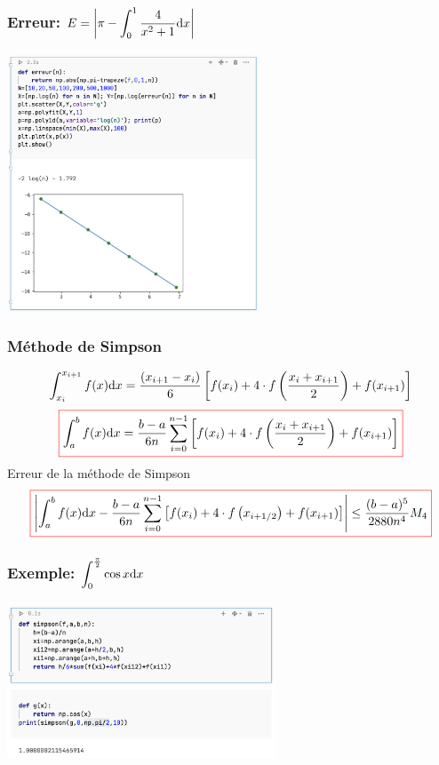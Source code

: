 \documentclass{beamer}
\def \de {{\rm d}}
\newcommand{\myredbox}[1]{\fcolorbox{red}{white}{$\displaystyle#1$}}
\begin{document}
\begin{frame}
 \frametitle{Erreur: $\displaystyle E=\left|\pi - \int_0^1\frac{4}{x^2+1}\de x \right|$}
\begin{center}
\includegraphics[width=7.5cm]{images/methodeDeTrapeze01.png}
\end{center}
 

\end{frame}
\begin{frame}
 \frametitle{Méthode de Simpson}
  \[\int_{x_i}^{x_{i+1}}f(x)\de x=\frac{(x_{i+1}-x_i)}{6} \left[f(x_i)+4\cdot f\left(\frac{x_i+x_{i+1}}{2}\right) +f(x_{i+1})\right]\] 
 \[\myredbox{\int_a^bf(x)\de x= \frac{b-a}{6n}  \sum_{i=0}^{n-1} \left[f(x_i)+4\cdot f\left(\frac{x_i+x_{i+1}}{2}\right) +f(x_{i+1})\right] }\] 
 Erreur de la méthode de Simpson
 \[ \myredbox{\left| \int_a^bf(x)\de x -\frac{b-a}{6n}  \sum_{i=0}^{n-1} \left[f(x_i)+4\cdot 
 f\left(x_{i+1/2}\right) +f(x_{i+1})\right] \right| \leq   \frac{(b-a)^5}{2880n^4}M_4} \]
 \end{frame}
\begin{frame}
 \frametitle{Exemple: $\displaystyle \int_0^\frac{\pi}{2}\cos x\de x$}
 \includegraphics[width=8cm]{images/methodeDeSimpson00.png}
 

\end{frame}
\end{document}
